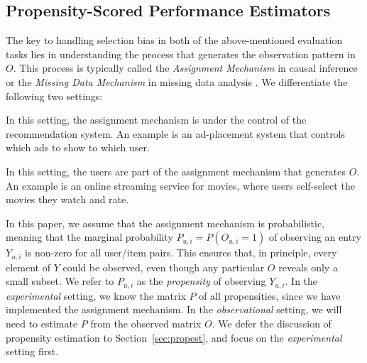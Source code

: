 \documentclass{article}
\newcommand{\user}{u}                       %
\newcommand{\movie}{i}                      %
\newcommand{\ytrue}{Y}                      %
\newcommand{\ytrueelem}[1]{\ytrue_{#1}}
\newcommand{\ytrueum}{\ytrueelem{\user,\movie}}
\newcommand{\obs}{O}                        %
\newcommand{\obselem}[1]{\obs_{#1}}
\newcommand{\obsum}{\obselem{\user,\movie}}
\newcommand{\probobs}{P}                    %
\newcommand{\probobselem}[1]{\probobs_{#1}}
\newcommand{\probobsum}{\probobselem{\user,\movie}}
\begin{document}
\subsection{Propensity-Scored Performance Estimators}
\label{sec:prop_estimators}
The key to handling selection bias in both of the above-mentioned evaluation tasks lies in understanding the process that generates the observation pattern in $\obs$. This process is typically called the {\em Assignment Mechanism} in causal inference \cite{Imbens/Rubin/15} or the {\em Missing Data Mechanism} in missing data analysis \cite{rubin2002mnar}.
We differentiate the following two settings:
\begin{compactdesc}
    \item[Experimental Setting.] In this setting, the assignment mechanism is under the control of the recommendation system. An example is an ad-placement system that controls which ads to show to which user.
    \item[Observational Setting.] In this setting, the users are part of the assignment mechanism that generates $\obs$. An example is an online streaming service for movies, where users self-select the movies they watch and rate.
\end{compactdesc}
In this paper, we assume that %
the assignment mechanism is probabilistic, meaning that the marginal probability $\probobsum=P(\obsum=1)$ of observing an entry $\ytrueum$ is non-zero for all user/item pairs. This ensures that, in principle, every element of $\ytrue$ could be observed, even though any particular $\obs$ reveals only a small subset.
We refer to $\probobsum$ as the \emph{propensity} of observing $\ytrueum$. 
In the \emph{experimental} setting, we know the matrix $\probobs$ of all propensities, since we have implemented the assignment mechanism. In the \emph{observational} setting, we will need to estimate $\probobs$ from the observed matrix $\obs$. 
We defer the discussion of propensity estimation to Section~\ref{sec:propest}, and focus on the \emph{experimental} setting first. %
\end{document}
